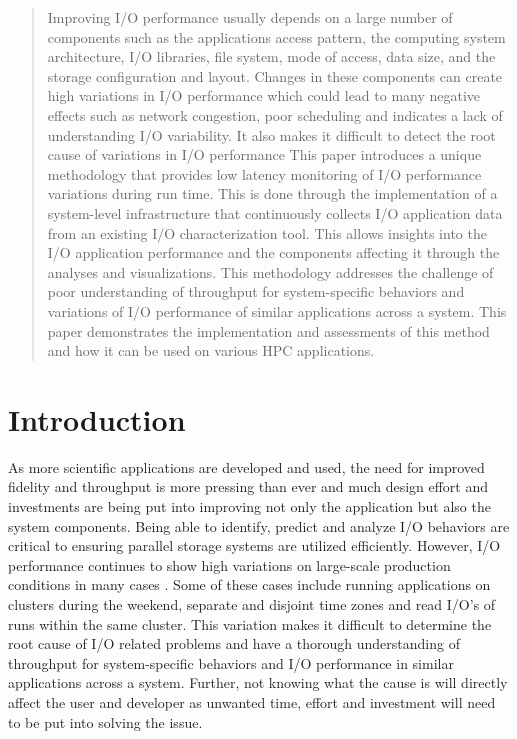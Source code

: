 \documentclass[conference]{IEEEtran}
\begin{document}
\begin{abstract}
Improving I/O performance usually depends on a large number of components such as the applications access pattern, the computing system architecture, I/O libraries, file system, mode of access, data size, and the storage configuration and layout. Changes in these components can create high variations in I/O performance which could lead to many negative effects such as network congestion, poor scheduling and indicates a lack of understanding I/O variability. It also makes it difficult to detect the root cause of variations in I/O performance 
This paper introduces a unique methodology that provides low latency monitoring of I/O performance variations during run time. This is done through the implementation of a system-level infrastructure that continuously collects I/O application data from an existing I/O characterization tool. This allows insights into the I/O application performance and the components affecting it through the analyses and visualizations.
This methodology addresses the challenge of poor understanding of throughput for system-specific behaviors and variations of I/O performance of similar applications across a system. This paper demonstrates the implementation and assessments of this method and how it can be used on various HPC applications.
\end{abstract}

\section{Introduction}
As more scientific applications are developed and used, the need for improved fidelity and throughput is more pressing than ever and much design effort and investments are being put into improving not only the application but also the system components. Being able to identify, predict and analyze I/O behaviors are critical to ensuring parallel storage systems are utilized efficiently. However, I/O performance continues to show high variations on large-scale production conditions in many cases . Some of these cases include running applications on clusters during the weekend, separate and disjoint time zones and read I/O's of runs within the same cluster. 
This variation makes it difficult to determine the root cause of I/O related problems and have a thorough understanding of throughput for system-specific behaviors and I/O performance in similar applications across a system. Further, not knowing what the cause is will directly affect the user and developer as unwanted time, effort and investment will need to be put into solving the issue.
\end{document}
